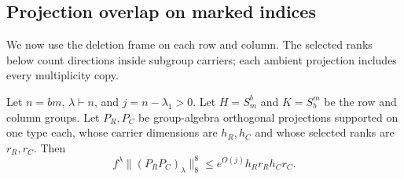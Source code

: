 \subsection{Projection overlap on marked indices}
\label{ten:frames:part:49}
We now use the deletion frame on each row and column. The selected ranks below count directions inside subgroup carriers; each ambient projection includes every multiplicity copy.
\begin{lemma}\label{lem:selected-rank}
Let $n=bm$, $\lambda\vdash n$, and $j=n-\lambda_1>0$. Let $H=S_m^b$ and $K=S_b^m$ be the row and column groups. Let $P_R,P_C$ be group-algebra orthogonal projections supported on one type each, whose carrier dimensions are $h_R,h_C$ and whose selected ranks are $r_R,r_C$. Then
\begin{equation}
 f^\lambda\|(P_R P_C)_\lambda\|_8^8
 \le e^{O(j)}h_Rr_Rh_Cr_C.
 \label{ten:frames:eq:6}
\end{equation}
\end{lemma}
